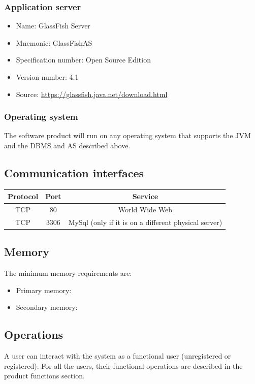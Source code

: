 \documentclass[10pt,a4paper,titlepage]{article}
\begin{document}
\subsubsection{Application server}
\begin{itemize}
\item Name: GlassFish Server
\item Mnemonic: GlassFishAS
\item Specification number: Open Source Edition
\item Version number: 4.1
\item Source: \url{https://glassfish.java.net/download.html}
\end{itemize}

\subsubsection{Operating system}
The software product will run on any operating system that supports the JVM and the DBMS and AS described above.

\subsection{Communication interfaces}
\begin{tabular}{|c|c|c|}
\hline Protocol & Port & Service \\ 
\hline TCP & 80 & World Wide Web \\ 
\hline TCP & 3306 & MySql (only if it is on a different physical server) \\ 
\hline 
\end{tabular}

\subsection{Memory}
The minimum memory requirements are:
\begin{itemize}
\item Primary memory:
\item Secondary memory:
\end{itemize}

\subsection{Operations}
A user can interact with the system as a functional user (unregistered or registered). For all the users, their functional operations are described in the product functions section.
\end{document}
